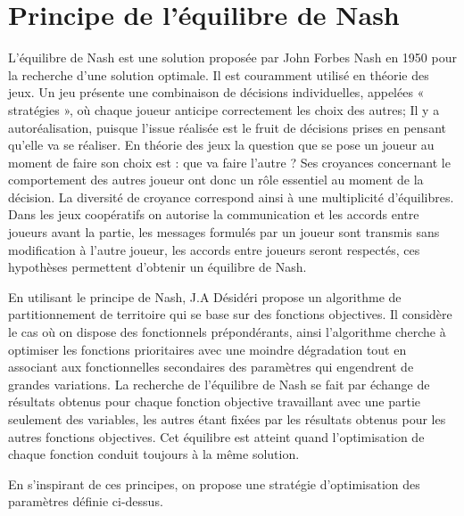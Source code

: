 
\section{Principe de l’\'{e}quilibre de Nash}
 
L'\'{e}quilibre de Nash est une solution propos\'{e}e par John Forbes Nash en 1950 \citep{depriester1950johnnash} pour la recherche d’une solution optimale. Il est couramment utilis\'{e} en th\'{e}orie des jeux. Un jeu pr\'{e}sente une combinaison de d\'{e}cisions individuelles, appel\'{e}es « strat\'{e}gies », où chaque joueur anticipe correctement les choix des autres; Il y a autor\'{e}alisation, puisque l'issue r\'{e}alis\'{e}e est le fruit de d\'{e}cisions prises en pensant qu'elle va se r\'{e}aliser. En th\'{e}orie des jeux la question que se pose un joueur au moment de faire son choix est : que va faire l'autre ? Ses croyances concernant le comportement des autres joueur ont donc un rôle essentiel au moment de la d\'{e}cision. La diversit\'{e} de croyance correspond ainsi \`{a} une multiplicit\'{e} d'\'{e}quilibres. Dans les jeux coop\'{e}ratifs on autorise la communication et les accords entre joueurs avant la partie, les messages formul\'{e}s par un joueur sont transmis sans modification \`{a} l'autre joueur, les accords entre joueurs seront respect\'{e}s, ces hypoth\`{e}ses permettent d'obtenir un \'{e}quilibre de Nash.

En utilisant le principe de Nash, J.A D\'{e}sid\'{e}ri \citep{depriester2007jeanantoine} propose un algorithme de partitionnement de territoire qui se base sur des fonctions objectives. Il consid\`{e}re le cas où on dispose des fonctionnels pr\'{e}pond\'{e}rants, ainsi l'algorithme cherche \`{a} optimiser les fonctions prioritaires avec une moindre d\'{e}gradation tout en associant aux fonctionnelles secondaires des param\`{e}tres qui engendrent de grandes variations. La recherche de l’\'{e}quilibre de Nash se fait par \'{e}change de r\'{e}sultats obtenus pour chaque fonction objective travaillant avec une partie seulement des variables, les autres \'{e}tant fix\'{e}es par les r\'{e}sultats obtenus pour les autres fonctions objectives. Cet \'{e}quilibre est atteint quand l’optimisation de chaque fonction conduit toujours \`{a} la m\^{e}me solution.

En s'inspirant de ces principes, on propose une strat\'{e}gie d'optimisation des param\`{e}tres définie ci-dessus.